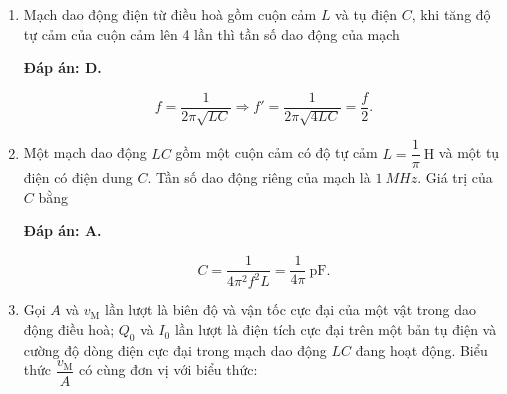 \begin{enumerate}[label=\bfseries Câu \arabic*:]
	
	\item {} 
	
	{ Mạch dao động điện từ điều hoà gồm cuộn cảm $L$ và tụ điện $C$, khi tăng độ tự cảm của cuộn cảm lên 4 lần thì tần số dao động của mạch
		
	}
	\hideall
	{		\textbf{Đáp án: D.}
		
	$$f = \dfrac{1}{2\pi\sqrt{LC}} \Rightarrow f' = \dfrac{1}{2\pi\sqrt{4LC}} = \dfrac{f}{2}.$$
		
	}
		\item {} 
	
	{ Một mạch dao động $LC$ gồm một cuộn cảm có độ tự cảm $L=\dfrac{1}{\pi}\ \text{H}$ và một tụ điện có điện dung $C$. Tần số dao động riêng của mạch là $\SI{1}{MHz}$. Giá trị của $C$ bằng
		
	}
	\hideall
	{		\textbf{Đáp án: A.}
		
		$$C= \dfrac{1}{4\pi^2f^2 L}  = \dfrac{1}{4\pi}\ \text{pF}.$$
		
	}
		\item {} 
	
	{ Gọi $A$ và $v_\text{M}$ lần lượt là biên độ và vận tốc cực đại của một vật trong dao động điều hoà; $Q_0$ và $I_0$ lần lượt là điện tích cực đại trên một bản tụ điện và cường độ dòng điện cực đại trong mạch dao động $LC$ đang hoạt động. Biểu thức $\dfrac{v_\text{M}}{A}$ có cùng đơn vị với biểu thức:
		
}
\end{enumerate}
